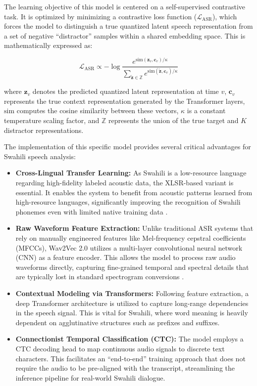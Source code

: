 The learning objective of this model is centered on a self-supervised contrastive task. It is optimized by minimizing a contrastive loss function ($\mathcal{L}_{\text{ASR}}$), which forces the model to distinguish a true quantized latent speech representation from a set of negative ``distractor'' samples within a shared embedding space. This is mathematically expressed as:

\begin{equation}
    \mathcal{L}_{\text{ASR}} \propto - \log \frac{e^{\text{sim}(\mathbf{z}_v, \mathbf{c}_v) / \kappa}}{\sum_{\tilde{\mathbf{z}} \in \mathbb{Z}} e^{\text{sim}(\tilde{\mathbf{z}}, \mathbf{c}_v) / \kappa}}
\end{equation}

where $\mathbf{z}_v$ denotes the predicted quantized latent representation at time $v$, $\mathbf{c}_v$ represents the true context representation generated by the Transformer layers, $\text{sim}$ computes the cosine similarity between these vectors, $\kappa$ is a constant temperature scaling factor, and $\mathbb{Z}$ represents the union of the true target and $K$ distractor representations.

The implementation of this specific model provides several critical advantages for Swahili speech analysis:
\begin{itemize}
    \item \textbf{Cross-Lingual Transfer Learning:} As Swahili is a low-resource language regarding high-fidelity labeled acoustic data, the XLSR-based variant is essential. It enables the system to benefit from acoustic patterns learned from high-resource languages, significantly improving the recognition of Swahili phonemes even with limited native training data \citep{eddiegulay2021wav2vec2}.
    
    \item \textbf{Raw Waveform Feature Extraction:} Unlike traditional ASR systems that rely on manually engineered features like Mel-frequency cepstral coefficients (MFCCs), Wav2Vec 2.0 utilizes a multi-layer convolutional neural network (CNN) as a feature encoder. This allows the model to process raw audio waveforms directly, capturing fine-grained temporal and spectral details that are typically lost in standard spectrogram conversions \citep{baevski2020wav2vec20frameworkselfsupervised}.
    
    \item \textbf{Contextual Modeling via Transformers:} Following feature extraction, a deep Transformer architecture is utilized to capture long-range dependencies in the speech signal. This is vital for Swahili, where word meaning is heavily dependent on agglutinative structures such as prefixes and suffixes.
    
    \item \textbf{Connectionist Temporal Classification (CTC):} The model employs a CTC decoding head to map continuous audio signals to discrete text characters. This facilitates an ``end-to-end'' training approach that does not require the audio to be pre-aligned with the transcript, streamlining the inference pipeline for real-world Swahili dialogue.
\end{itemize}

